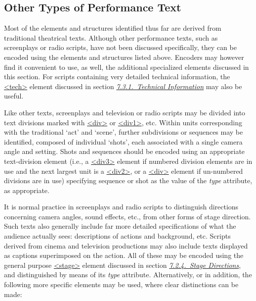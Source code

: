 \subsection[{Other Types of Performance Text}]{Other Types of Performance Text}\label{DROTH}\par
Most of the elements and structures identified thus far are derived from traditional theatrical texts. Although other performance texts, such as screenplays or radio scripts, have not been discussed specifically, they can be encoded using the elements and structures listed above. Encoders may however find it convenient to use, as well, the additional specialized elements discussed in this section. For scripts containing very detailed technical information, the \hyperref[TEI.tech]{<tech>} element discussed in section \textit{\hyperref[DRTEC]{7.3.1.\ Technical Information}} may also be useful.\par
Like other texts, screenplays and television or radio scripts may be divided into text divisions marked with \hyperref[TEI.div]{<div>} or \hyperref[TEI.div1]{<div1>}, etc. Within units corresponding with the traditional ‘act’ and ‘scene’, further subdivisions or sequences may be identified, composed of individual ‘shots’, each associated with a single camera angle and setting. Shots and sequences should be encoded using an appropriate text-division element (i.e., a \hyperref[TEI.div3]{<div3>} element if numbered division elements are in use and the next largest unit is a \hyperref[TEI.div2]{<div2>}, or a \hyperref[TEI.div]{<div>} element if un-numbered divisions are in use) specifying sequence or shot as the value of the {\itshape type} attribute, as appropriate.\par
It is normal practice in screenplays and radio scripts to distinguish directions concerning camera angles, sound effects, etc., from other forms of stage direction. Such texts also generally include far more detailed specifications of what the audience actually sees: descriptions of actions and background, etc. Scripts derived from cinema and television productions may also include texts displayed as captions superimposed on the action. All of these may be encoded using the general purpose \hyperref[TEI.stage]{<stage>} element discussed in section \textit{\hyperref[DRSTA]{7.2.4.\ Stage Directions}}, and distinguished by means of its {\itshape type} attribute. Alternatively, or in addition, the following more specific elements may be used, where clear distinctions can be made: 
